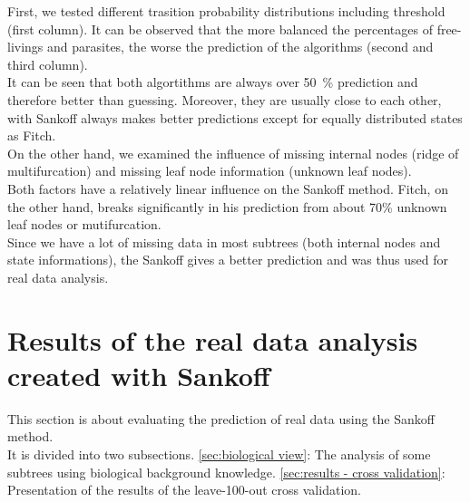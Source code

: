     First, we tested different trasition probability distributions including threshold (first column). 
      It can be observed that the more balanced the percentages of free-livings and parasites, the 
      worse the prediction of the algorithms (second and third column). \\
    It can be seen that both algortithms are always over 50~\% prediction and therefore better than 
      guessing. Moreover, they are usually close to each other, with Sankoff always makes better 
      predictions except for equally distributed states as Fitch. \\
    On the other hand, we examined the influence of missing internal nodes (ridge of multifurcation) 
      and missing leaf node information (unknown leaf nodes). \\
    Both factors have a relatively linear influence on the Sankoff method. Fitch, on the other hand, 
      breaks significantly in his prediction from about 70\% unknown leaf nodes or mutifurcation. \\

    Since we have a lot of missing data in most subtrees (both internal nodes and state informations), 
      the Sankoff gives a better prediction and was thus used for real data analysis.

  \section{Results of the real data analysis created with Sankoff}
    This section is about evaluating the prediction of real data using the Sankoff method. \\
    It is divided into two subsections. \ref{sec:biological view}: The analysis of some subtrees using 
      biological background knowledge. \ref{sec:results - cross validation}: Presentation of the results 
      of the leave-100-out cross validation.

